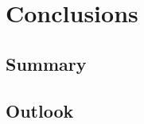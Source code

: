 \chapter{Conclusions} \label{chap:conclusions}
\section{Summary} \label{sec:conclusions_summary}
\section{Outlook} \label{sec:conclusions_outlook}
